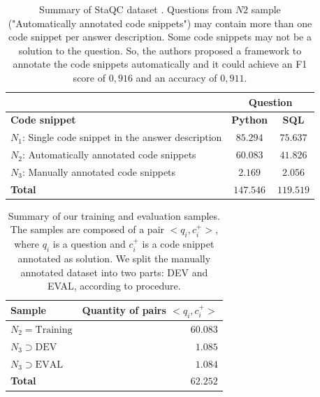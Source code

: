 \documentclass[sigconf]{acmart}
\begin{document}
\begin{table}[h]
\centering
\begin{tabular}{ p{5cm} c c }
\hline
  & \multicolumn{2}{c}{\textbf{Question}}\\
\hline
\textbf{Code snippet} & \textbf{Python} & \textbf{SQL}  \\
\hline

$N_{1}$: Single code snippet in the answer description & $85.294$ & $75.637$ \\

$N_{2}$: Automatically annotated code snippets & $60.083$ & $41.826$ \\

$N_{3}$: Manually annotated code snippets & $2.169$ & $2.056$  \\

 \hline
 \textbf{Total} & $\bm{147.546}$ & $\bm{119.519}$\\
 \hline 

\end{tabular}
\caption{Summary of StaQC dataset \cite{yao-2018}. Questions from $N2$ sample ("Automatically annotated code snippets") may contain more than one code snippet per answer description. Some code snippets may not be a solution to the question. So, the authors proposed a framework to annotate the code snippets automatically and it could achieve an F1 score of $0,916$ and an accuracy of $0,911$.}
\label{table:summary-training-data-yao-staqc}
\end{table}

\begin{table}[h]
\centering
\begin{tabular}{ l r  }
 \hline
 \textbf{Sample} & \textbf{Quantity of pairs $<q_{i}, c_{i}^{+}>$}\\
 \hline
 $N_{2} = \text{Training}$ & $60.083$\\
 
 $N_{3} \supset \text{DEV}$ & $1.085$ \\
 
 $N_{3} \supset \text{EVAL}$ & $1.084$\\
 \hline
 \textbf{Total} & $\bm{62.252}$\\
 \hline
\end{tabular}
\caption{Summary of our training and evaluation samples. The samples are composed of a pair $<q_{i}, c_{i}^{+}>$, where $q_{i}$ is a question and $c_{i}^{+}$ is a code snippet annotated as solution. We split the manually annotated dataset into two parts: DEV and EVAL, according to \cite{iyer-etal-2016-summarizing} procedure. }
\label{table:training-sample-division}
\end{table}
\end{document}
